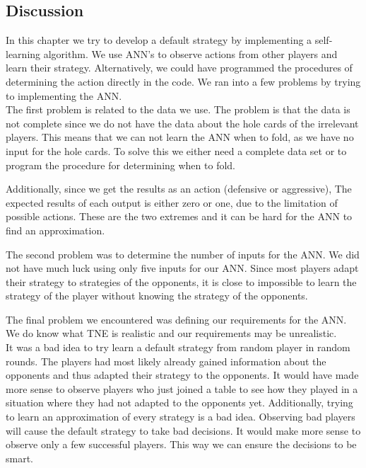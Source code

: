 \subsection{Discussion}
In this chapter we try to develop a default strategy by implementing a self-learning algorithm. We use ANN's to observe actions from other players and learn their strategy. Alternatively, we could have programmed the procedures of determining the action directly in the code. We ran into a few problems by trying to implementing the ANN.\\

The first problem is related to the data we use. The problem is that  the data is not complete since we do not have the data about the hole cards of the irrelevant players. This means that we can not learn the ANN when to fold, as we have no input for the hole cards. To solve this we either need a complete data set or to program the procedure for determining when to fold. 

Additionally, since we get the results as an action (defensive or aggressive), The expected results of each output is either zero or one, due to the limitation of possible actions. These are the two extremes and it can be hard for the ANN to find an approximation.

The second problem was to determine the number of inputs for the ANN. We did not have much luck using only five inputs for our ANN. Since most players adapt their strategy to strategies of the opponents, it is close to impossible to learn the strategy of the player without knowing the strategy of the opponents.

The final problem we encountered was defining our requirements for the ANN. We do know what TNE is realistic and our requirements may be unrealistic. \\

It was a bad idea to try learn a default strategy from random player in random rounds. The players had most likely already gained information about the opponents and thus adapted their strategy to the opponents. It would have made more sense to observe players who just joined a table to see how they played in a situation where they had not adapted to the opponents yet.
Additionally, trying to learn an approximation of every strategy is a bad idea. Observing bad players will cause the default strategy to take bad decisions. It would make more sense to observe only a few successful players. This way we can ensure the decisions to be smart. 

